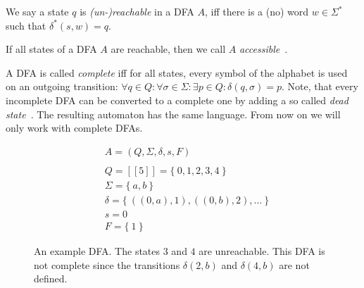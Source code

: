 \begin{definition}\label{ch:2:unreachable-states}
	We say a state $q$ is \emph{(un-)reachable} in a DFA $A$, iff there is a (no) word $w \in \Sigma^*$ such that $\delta^*(s, w) = q$.
\end{definition}
\noindent If all states of a DFA $A$ are reachable, then we call $A$ \emph{accessible}~\cite[p. 2]{CP05}.

A DFA is called \emph{complete} iff for all states, every symbol of the alphabet is used on an outgoing transition: $\forall q\in Q\colon \forall\sigma\in\Sigma\colon \exists p\in Q\colon \delta(q,\sigma) = p$. Note, that every incomplete DFA can be converted to a complete one by adding a so called \emph{dead state}~\cite[p. 67]{HMU01}. The resulting automaton has the same language. From now on we will only work with complete DFAs.

\begin{figure}[H]
	\begin{subfigure}{.5\textwidth}\centering{}\end{subfigure}
	\hfill
	\begin{subfigure}{.4\textwidth}
		\begin{align*}
			&A = (Q, \Sigma, \delta, s ,F) \\
			&\\
			&Q = [[5]] = \{\ 0,1,2,3,4\ \} \\
			&\Sigma = \{\ a,b\ \} \\
			&\delta = \{\ ((0,a),1), ((0,b),2), \ldots\ \} \\
			&s = 0 \\
			&F = \{\ 1\ \}
		\end{align*}
	\end{subfigure}
	\caption{An example DFA. The states $3$ and $4$ are unreachable. This DFA is not complete since the transitions $\delta(2,b)$ and $\delta(4,b)$ are not defined.}
	\label{fig:dfa}
\end{figure}

